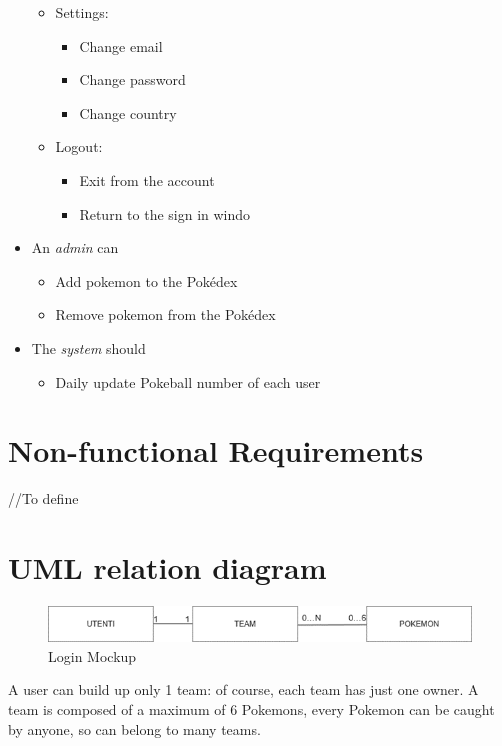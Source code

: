 \begin{itemize}
\begin{itemize}
        \item Settings:
        \begin{itemize}
            \item Change email
            \item Change password
            \item Change country
        \end{itemize}
        \item Logout:
        \begin{itemize}
            \item Exit from the account
            \item Return to the sign in windo
        \end{itemize}
    \end{itemize}
    \item An \textit{admin} can
    \begin{itemize}
        \item Add pokemon to the Pokédex
        \item Remove pokemon from the Pokédex
    \end{itemize}
    \item The \textit{system} should
    \begin{itemize}
        \item Daily update Pokeball number of each user
    \end{itemize}
\end{itemize}
\section{Non-functional Requirements}
//To define
\section{UML relation diagram}

\begin{figure}[h]
    \centering
    \includegraphics[width=\textwidth]{img/Picture7.png}
    \caption{Login Mockup}
\end{figure}

A user can build up only 1 team: of course, each team has just one owner.
A team is composed of a maximum of 6 Pokemons, every Pokemon can be caught by anyone, so can belong to many teams.
